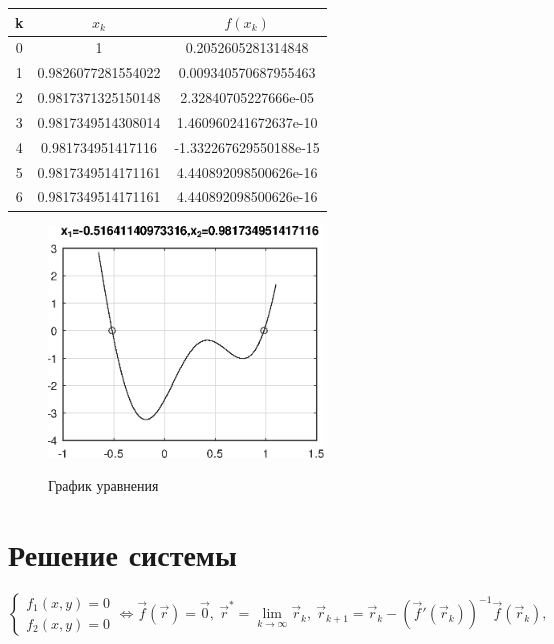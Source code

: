 \documentclass[12pt,a4paper]{article}
\begin{document}
\begin{table}[!h]
	\centering
	\begin{tabular}{|c|c|c|}
		\hline
		k & $x_k$              & $f(x_k)$               \\ \hline
		0 & 1                  & 0.2052605281314848     \\ \hline
		1 & 0.9826077281554022 & 0.009340570687955463   \\ \hline
		2 & 0.9817371325150148 & 2.32840705227666e-05   \\ \hline
		3 & 0.9817349514308014 & 1.460960241672637e-10  \\ \hline
		4 & 0.981734951417116  & -1.332267629550188e-15 \\ \hline
		5 & 0.9817349514171161 & 4.440892098500626e-16  \\ \hline
		6 & 0.9817349514171161 & 4.440892098500626e-16  \\ \hline
	\end{tabular}

\end{table}
\newpage
	\begin{figure}[h!] 
	\centering
	\renewcommand{\figurename}{Рисунок}
	\includegraphics [width=0.65\textwidth]{../equation.eps}\\ 
	\caption{График уравнения  \label{fig.1}}
\end{figure}

\section{Решение системы}
\begin{equation*}
	\begin{cases}
		f_1(x,y)=0
		\\
		f_2(x,y)=0
	\end{cases}
	\Leftrightarrow
	\vec{f}(\vec{r})=\vec{0},~
	\vec{r}^*=\lim_{k\to \infty}\vec{r}_k,~
	\vec{r}_{k+1}=\vec{r}_k-(\vec{f}'(\vec{r}_k))^{-1}\vec{f}(\vec{r}_k),~
\end{equation*}
\end{document}
